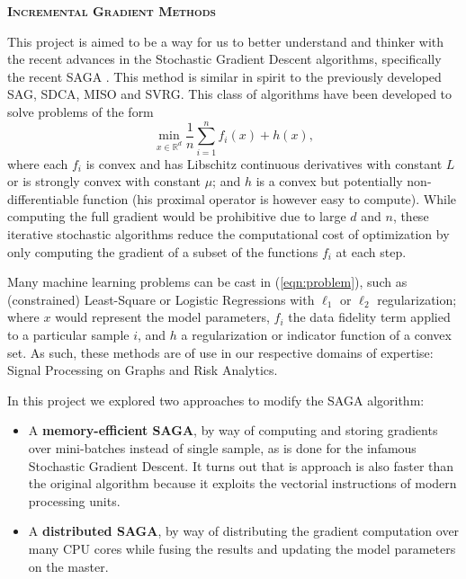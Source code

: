 \documentclass[a4paper,11pt]{article}
\newcommand{\R}{\mathbb{R}}
\newcommand{\eqnref}[1]{(\ref{eqn:#1})}
\begin{document}
\begin{center}
	\Large{\textbf{\textsc{Incremental Gradient Methods}}}
\end{center}

This project is aimed to be a way for us to better understand and thinker with
the recent advances in the Stochastic Gradient Descent algorithms, specifically
the recent SAGA \cite{defazio_saga_2014}. This method is similar in spirit to
the previously developed SAG, SDCA, MISO and SVRG. This class of algorithms have
been developed to solve problems of the form
\begin{equation} \label{eqn:problem}
	\min_{x \in \R^d} \frac{1}{n} \sum_{i=1}^n f_i(x) + h(x),
\end{equation}
where each $f_i$ is convex and has Libschitz continuous derivatives with
constant $L$ or is strongly convex with constant $\mu$; and $h$ is a convex but
potentially non-differentiable function (his proximal operator is however easy
to compute). While computing the full gradient would be prohibitive due to large
$d$ and $n$, these iterative stochastic algorithms reduce the computational cost
of optimization by only computing the gradient of a subset of the functions
$f_i$ at each step.

Many machine learning problems can be cast in \eqnref{problem}, such as
(constrained) Least-Square or Logistic Regressions with $\ell_1$ or $\ell_2$
regularization; where $x$ would represent the model parameters, $f_i$ the data
fidelity term applied to a particular sample $i$, and $h$ a regularization or
indicator function of a convex set. As such, these methods are of use in our
respective domains of expertise: Signal Processing on Graphs and Risk Analytics.

In this project we explored two approaches to modify the SAGA algorithm:
\begin{itemize}
	\item A \textbf{memory-efficient SAGA}, by way of computing and storing
		gradients over mini-batches instead of single sample, as is done for the
		infamous Stochastic Gradient Descent. It turns out that is approach is
		also faster than the original algorithm because it exploits the
		vectorial instructions of modern processing units.
	\item A \textbf{distributed SAGA}, by way of distributing the gradient
		computation over many CPU cores while fusing the results and updating
		the model parameters on the master.
\end{itemize}
\end{document}
